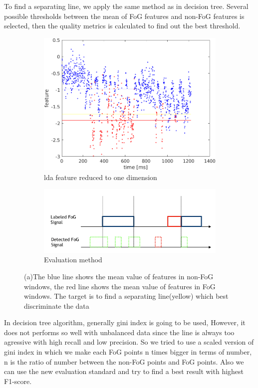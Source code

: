 \documentclass[article]{article}
\begin{document}
	
	To find a separating line, we apply the same method as in decision tree. Several possible thresholds between the mean of FoG features and non-FoG features is selected, then the quality metrics is calculated to find out the best threshold. 
	
	\begin{figure}	
		 \begin{center}	
	\begin{subfigure}[b]{0.45\textwidth}
		\centering
		\includegraphics[width=\textwidth]{classifier}
		\caption{lda feature reduced to one dimension}
		\label{lda1}
	\end{subfigure}

	\begin{subfigure}[b]{0.45\textwidth}
	\centering
	\includegraphics[width=\textwidth]{evaluation}
	\caption{Evaluation method}
	\label{eva}	
	\end{subfigure}
	\caption{(a)The blue line shows the mean value of features in non-FoG windows, the red line shows the mean value of features in FoG windows. The target is to find a separating line(yellow) which best discriminate the data}

\end{center}
\end{figure}
	In decision tree algorithm, generally gini index is going to be used, However, it does not performs so well with unbalanced data since the line is always too agressive with high recall and low precision. So we tried to use a  scaled version of gini index in which we make each FoG points n times bigger in terms of number, n is the ratio of number between the non-FoG points and FoG points. Also we can use the new evaluation standard and try to find a best result with highest F1-score.
	
\end{document}

